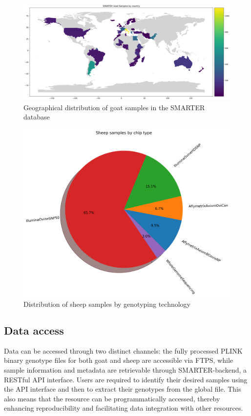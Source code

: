 \documentclass[a4paper,num-refs,gigabyte]{oup-contemporary}
\begin{document}
\begin{figure}
\centering
\includegraphics[width=.95\textwidth]{goat-by-country.png}
\caption{Geographical distribution of goat samples in the SMARTER database}
\label{fig:goat_samples}
\end{figure}

\begin{figure}
\centering
\includegraphics[width=.45\textwidth]{sheep-samples-by-chip-type.png}
\caption{Distribution of sheep samples by genotyping technology}
\label{fig:sheep_technology}
\end{figure}

\subsection{Data access}

Data can be accessed through two distinct channels: the fully processed PLINK binary genotype files for both goat and sheep are accessible via FTPS, while sample information and metadata are retrievable through SMARTER-backend\citep{SMARTERAPI}, a RESTful API interface\citep{REST}. Users are required to identify their desired samples using the API interface and then to extract their genotypes from the global file. This also means that the resource can be programmatically accessed, thereby enhancing reproducibility and facilitating data integration with other resources.
\end{document}
